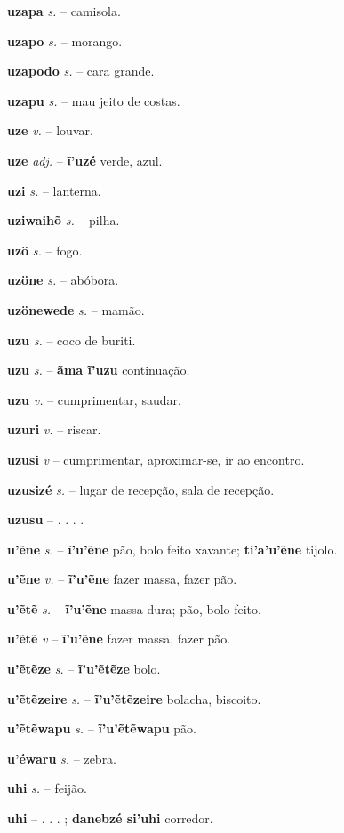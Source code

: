 \textbf{uzapa} \textit{s.} -- camisola.

\textbf{uzapo} \textit{s.} -- morango.

\textbf{uzapodo} \textit{s.} -- cara grande.

\textbf{uzapu} \textit{s.} -- mau jeito de costas.

\textbf{uze} \textit{v.} -- louvar.

\textbf{uze} \textit{adj.} -- \textbf{ĩ'uzé} verde, azul.

\textbf{uzi} \textit{s.} -- lanterna.

\textbf{uziwaihõ} \textit{s.} -- pilha.

\textbf{uzö} \textit{s.} -- fogo.

\textbf{uzöne} \textit{s.} -- abóbora.

\textbf{uzönewede} \textit{s.} -- mamão.

\textbf{uzu} \textit{s.} -- coco de buriti.

\textbf{uzu} \textit{s.} -- \textbf{ãma ĩ'uzu} continuação.

\textbf{uzu} \textit{v.} -- cumprimentar, saudar.

\textbf{uzuri} \textit{v.} -- riscar.

\textbf{uzusi} \textit{v} -- cumprimentar, aproximar-se, ir ao encontro.

\textbf{uzusizé} \textit{s.} -- lugar de recepção, sala de recepção.

\textbf{uzusu} \textit{} -- . . . .

\textbf{u'ẽne} \textit{s.} -- \textbf{ĩ'u'ẽne} pão, bolo feito xavante; \textbf{ti'a'u'ẽne} tijolo.

\textbf{u'ẽne} \textit{v.} -- \textbf{ĩ'u'ẽne} fazer massa, fazer pão.

\textbf{u'ẽtẽ} \textit{s.} -- \textbf{ĩ'u'ẽne} massa dura; pão, bolo feito.

\textbf{u'ẽtẽ} \textit{v} -- \textbf{ĩ'u'ẽne} fazer massa, fazer pão.

\textbf{u'ẽtẽze} \textit{s.} -- \textbf{ĩ'u'ẽtẽze} bolo.

\textbf{u'ẽtẽzeire} \textit{s.} -- \textbf{ĩ'u'ẽtẽzeire} bolacha, biscoito.

\textbf{u'ẽtẽwapu} \textit{s.} -- \textbf{ĩ'u'ẽtẽwapu} pão.

\textbf{u'éwaru} \textit{s.} -- zebra.

\textbf{uhi} \textit{s.} -- feijão.

\textbf{uhi} \textit{} -- . . . ; \textbf{danebzé si'uhi} corredor.

